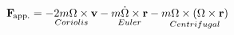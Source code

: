 \documentclass[preview]{standalone}
\begin{document}
\begin{align*}
\textbf{F}_\text{\!app.}=\underset{Coriolis}{-2m\Omega\times\textbf{v}}-\underset{Euler}{m\dot{\Omega}\times\textbf{r}}-\underset{Centrifugal}{m\Omega\times(\Omega\times\textbf{r})}
\end{align*}
\end{document}
